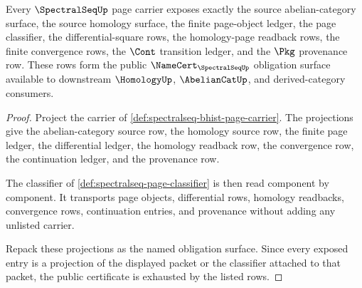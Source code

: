 \begin{theorem}
\label{thm:spectralseq-obligation-surface}
Every $\SpectralSeqUp$ page carrier exposes exactly the source abelian-category
surface, the source homology surface, the finite page-object ledger, the page
classifier, the differential-square rows, the homology-page readback rows, the
finite convergence rows, the $\Cont$ transition ledger, and the $\Pkg$
provenance row. These rows form the public $\NameCert_{\SpectralSeqUp}$
obligation surface available to downstream $\HomologyUp$,
$\AbelianCatUp$, and derived-category consumers.
\end{theorem}
\begin{proof}
Project the carrier of \autoref{def:spectralseq-bhist-page-carrier}. The
projections give the abelian-category source row, the homology source row, the
finite page ledger, the differential ledger, the homology readback row, the
convergence row, the continuation ledger, and the provenance row.

The classifier of \autoref{def:spectralseq-page-classifier} is then read
component by component. It transports page objects, differential rows,
homology readbacks, convergence rows, continuation entries, and provenance
without adding any unlisted carrier.

Repack these projections as the named obligation surface. Since every exposed
entry is a projection of the displayed packet or the classifier attached to
that packet, the public certificate is exhausted by the listed rows.
\end{proof}

